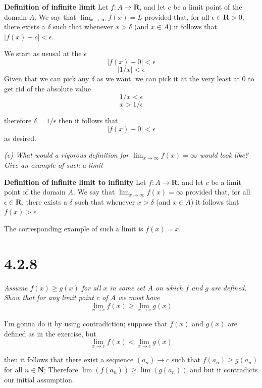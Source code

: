 \documentclass[11pt,oneside,titlepage]{book}
\begin{document}
\textbf{Definition of infinite limit}
Let $f : A \to \textbf{R}$, and let $c$ be a limit point of the domain $A$. We say that
$\lim_{x \to \infty} f(x) = L$ provided that, for all $\epsilon \in \textbf{R} > 0$, there exists
a $\delta$ such that whenever $x > \delta$ (and $x \in A$) it follows
that $|f(x) - c | < \epsilon$.

We start as ususal at the $\epsilon$
$$|f(x) - 0| < \epsilon$$
$$|1/x| < \epsilon$$
Given that we can pick any $\delta$ as we want, we can pick it at the very least at $0$ to get rid
of the absolute value
$$1/x < \epsilon$$
$$x > 1/\epsilon$$

therefore $\delta = 1/\epsilon$ then it follows that $$|f(x) - 0| < \epsilon$$ as desired.

\textit{(c) What would a rigorous definition for $\lim_{x \to \infty} f(x) = \infty$ would look like? Give an example of such a limit}

\textbf{Definition of infinite limit to infinity}
Let $f : A \to \textbf{R}$, and let $c$ be a limit point of the domain $A$. We say that
$\lim_{x \to \infty} f(x) = \infty$ provided that, for all $\epsilon \in \textbf{R}$, there exists
a $\delta$ such that whenever $x > \delta$ (and $x \in A$) it follows
that $f(x) > \epsilon$.

The corresponding example of such a limit  is $f(x) = x$.

\section*{4.2.8}
\textit{Assume $f(x) \geq g(x)$ for all $x$ in some set $A$ on which $f$ and $g$ are defined. Show that for any limit point $c$ of $A$ we must have }
$$\lim_{x \to c} f(x) \geq \lim_{x \to c} g(x) $$

I'm gonna do it by using contradiction; suppose that $f(x)$ and $g(x)$ are defined as in the
exercise, but
$$\lim_{x \to c} f(x) <  \lim_{x \to c} g(x) $$






then it follows that there exist a sequence $(a_n) \to c$ such that $f(a_n) \geq g(a_n)$ for all
$n \in \textbf{N}$; Therefore $\lim(f(a_n)) \geq \lim(g(a_n))$ and  but it contradicts our
initial assumption.
\end{document}
